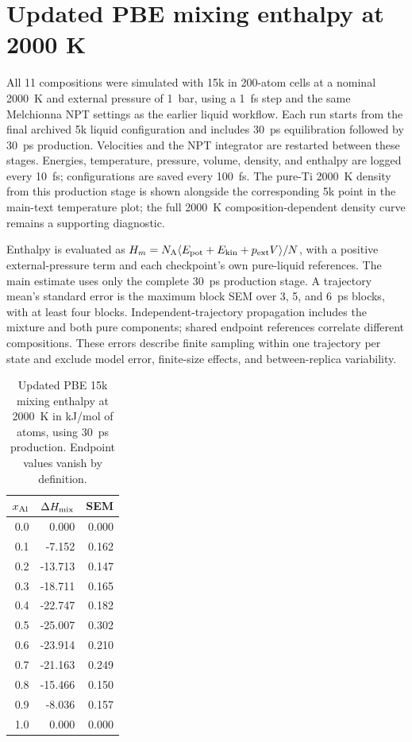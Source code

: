 \documentclass[10pt]{article}
\begin{document}
\section{Updated PBE mixing enthalpy at 2000 K}
All 11 compositions were simulated with 15k in 200-atom cells at a nominal 2000~K and external pressure of 1~bar, using a 1~fs step and the same Melchionna NPT settings as the earlier liquid workflow. Each run starts from the final archived 5k liquid configuration and includes 30~ps equilibration followed by 30~ps production. Velocities and the NPT integrator are restarted between these stages. Energies, temperature, pressure, volume, density, and enthalpy are logged every 10~fs; configurations are saved every 100~fs. The pure-Ti 2000~K density from this production stage is shown alongside the corresponding 5k point in the main-text temperature plot; the full 2000~K composition-dependent density curve remains a supporting diagnostic.

Enthalpy is evaluated as $H_m=N_{\rm A}\langle E_{\rm pot}+E_{\rm kin}+p_{\rm ext}V\rangle/N$, with a positive external-pressure term and each checkpoint's own pure-liquid references. The main estimate uses only the complete 30~ps production stage. A trajectory mean's standard error is the maximum block SEM over 3, 5, and 6~ps blocks, with at least four blocks. Independent-trajectory propagation includes the mixture and both pure components; shared endpoint references correlate different compositions. These errors describe finite sampling within one trajectory per state and exclude model error, finite-size effects, and between-replica variability.

\begin{table}[htbp]
\centering
\caption{Updated PBE 15k mixing enthalpy at 2000~K in kJ/mol of atoms, using 30~ps production. Endpoint values vanish by definition.}
\label{tab:enthalpy}
\begin{tabular}{rrr}
\toprule
$x_{\rm Al}$ & $\Delta H_{\rm mix}$ & SEM\\
\midrule
0.0 & 0.000 & 0.000 \\
0.1 & -7.152 & 0.162 \\
0.2 & -13.713 & 0.147 \\
0.3 & -18.711 & 0.165 \\
0.4 & -22.747 & 0.182 \\
0.5 & -25.007 & 0.302 \\
0.6 & -23.914 & 0.210 \\
0.7 & -21.163 & 0.249 \\
0.8 & -15.466 & 0.150 \\
0.9 & -8.036 & 0.157 \\
1.0 & 0.000 & 0.000 \\
\bottomrule
\end{tabular}
\end{table}
\end{document}
